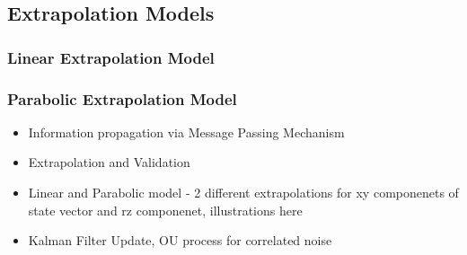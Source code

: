 \begin{figure}[htbp!] 
    \centering
    \hfill%
    \caption{}
    \label{fig:KL-distance}
\end{figure}





\subsection{Extrapolation Models}
\label{chapter-6-extrapolation}
\subsubsection{Linear Extrapolation Model}
\subsubsection{Parabolic Extrapolation Model}
\begin{itemize}
    \item Information propagation via Message Passing Mechanism
    \item Extrapolation and Validation
    \item Linear and Parabolic model - 2 different extrapolations for xy componenets of state vector and rz componenet, illustrations here
    \item Kalman Filter Update, OU process for correlated noise
\end{itemize}

